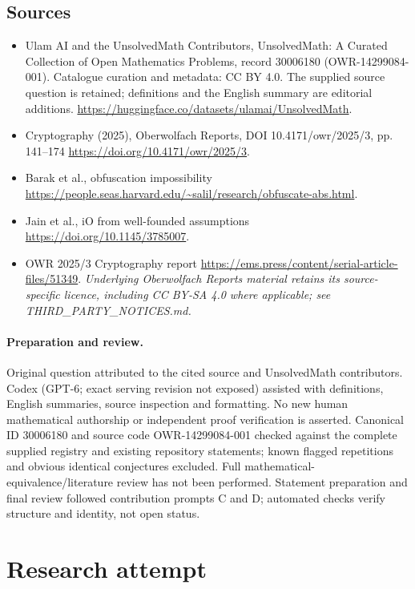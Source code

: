 \documentclass[11pt]{article}
\begin{document}
\subsection{Sources}
\begin{itemize}
\item[S1] Ulam AI and the UnsolvedMath Contributors, UnsolvedMath: A Curated Collection of Open Mathematics Problems, record 30006180 (OWR-14299084-001). Catalogue curation and metadata: CC BY 4.0. The supplied source question is retained; definitions and the English summary are editorial additions.
\url{https://huggingface.co/datasets/ulamai/UnsolvedMath}.
\item[S2] Cryptography (2025), Oberwolfach Reports, DOI 10.4171/owr/2025/3, pp. 141--174
\url{https://doi.org/10.4171/owr/2025/3}.
\item[S3] Barak et al., obfuscation impossibility
\url{https://people.seas.harvard.edu/~salil/research/obfuscate-abs.html}.
\item[S4] Jain et al., iO from well-founded assumptions
\url{https://doi.org/10.1145/3785007}.
\item[S5] OWR 2025/3 Cryptography report
\url{https://ems.press/content/serial-article-files/51349}.
\textit{Underlying Oberwolfach Reports material retains its source-specific licence, including CC BY-SA 4.0 where applicable; see THIRD\_PARTY\_NOTICES.md.}
\end{itemize}
\paragraph{Preparation and review.}
Original question attributed to the cited source and UnsolvedMath contributors. Codex (GPT-6; exact serving revision not exposed) assisted with definitions, English summaries, source inspection and formatting. No new human mathematical authorship or independent proof verification is asserted. Canonical ID 30006180 and source code OWR-14299084-001 checked against the complete supplied registry and existing repository statements; known flagged repetitions and obvious identical conjectures excluded. Full mathematical-equivalence/literature review has not been performed. Statement preparation and final review followed contribution prompts C and D; automated checks verify structure and identity, not open status.
\label{end:30006180}

\section{Research attempt}
\end{document}

